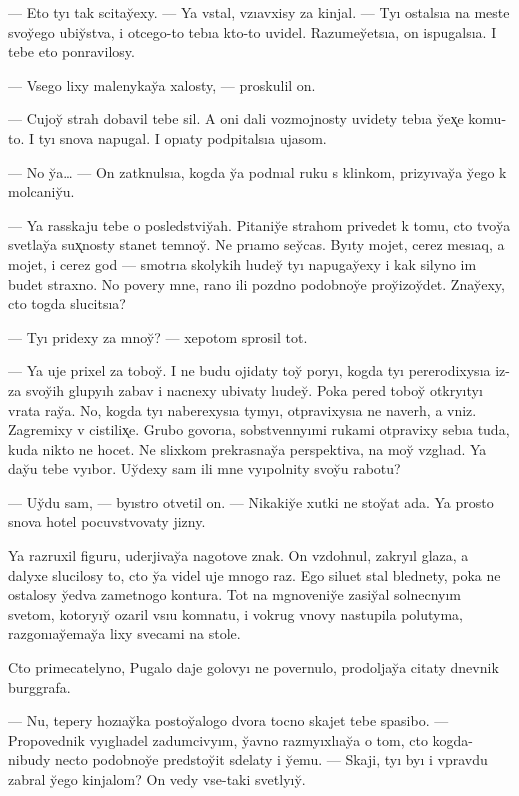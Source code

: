 \documentclass[10pt]{book}
\begin{document}
— Eto tyı tak scitay̆exy. — Ya vstal, vzıavxisy za kinjal. — Tyı ostalsıa na meste svoy̆ego ubiy̆stva, i otcego-to tebıa kto-to uvidel. Razumey̆etsıa, on ispugalsıa. I tebe eto ponravilosy.

— Vsego lixy malenykay̆a xalosty, — proskulil on.

— Cujoy̆ strah dobavil tebe sil. A oni dali vozmojnosty uvidety tebıa y̆ex̨e komu-to. I tyı snova napugal. I opıaty podpitalsıa ujasom.

— No y̆a… — On zatknulsıa, kogda y̆a podnıal ruku s klinkom, prizyıvay̆a y̆ego k molcaniy̆u.

— Ya rasskaju tebe o posledstviy̆ah. Pitaniy̆e strahom privedet k tomu, cto tvoy̆a svetlay̆a sux̨nosty stanet temnoy̆. Ne prıamo sey̆cas. Byıty mojet, cerez mesıaq, a mojet, i cerez god — smotrıa skolykih lıudey̆ tyı napugay̆exy i kak silyno im budet straxno. No povery mne, rano ili pozdno podobnoy̆e proy̆izoy̆det. Znay̆exy, cto togda slucitsıa?

— Tyı pridexy za mnoy̆? — xepotom sprosil tot.

— Ya uje prixel za toboy̆. I ne budu ojidaty toy̆ poryı, kogda tyı pererodixysıa iz-za svoy̆ih glupyıh zabav i nacnexy ubivaty lıudey̆. Poka pered toboy̆ otkryıtyı vrata ray̆a. No, kogda tyı naberexysıa tymyı, otpravixysıa ne naverh, a vniz. Zagremixy v cistilix̨e. Grubo govorıa, sobstvennyımi rukami otpravixy sebıa tuda, kuda nikto ne hocet. Ne slixkom prekrasnay̆a perspektiva, na moy̆ vzglıad. Ya day̆u tebe vyıbor. Uy̆dexy sam ili mne vyıpolnity svoy̆u rabotu?

— Uy̆du sam, — byıstro otvetil on. — Nikakiy̆e xutki ne stoy̆at ada. Ya prosto snova hotel pocuvstvovaty jizny.

Ya razruxil figuru, uderjivay̆a nagotove znak. On vzdohnul, zakryıl glaza, a dalyxe slucilosy to, cto y̆a videl uje mnogo raz. Ego siluet stal blednety, poka ne ostalosy y̆edva zametnogo kontura. Tot na mgnoveniy̆e zasiy̆al solnecnyım svetom, kotoryıy̆ ozaril vsıu komnatu, i vokrug vnovy nastupila polutyma, razgonıay̆emay̆a lixy svecami na stole.

Cto primecatelyno, Pugalo daje golovyı ne povernulo, prodoljay̆a citaty dnevnik burggrafa.

— Nu, tepery hozıay̆ka postoy̆alogo dvora tocno skajet tebe spasibo. — Propovednik vyıglıadel zadumcivyım, y̆avno razmyıxlıay̆a o tom, cto kogda-nibudy necto podobnoy̆e predstoy̆it sdelaty i y̆emu. — Skaji, tyı byı i vpravdu zabral y̆ego kinjalom? On vedy vse-taki svetlyıy̆.
\end{document}
